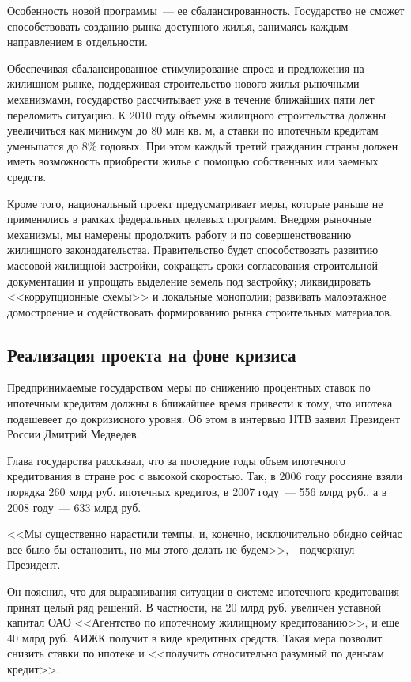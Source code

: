 \documentclass[article, 12pt, russian, oneside]{ncc}
\begin{document}
Особенность новой программы~--- ее сбалансированность. Государство не
сможет способствовать созданию рынка доступного жилья, занимаясь
каждым направлением в отдельности.

Обеспечивая сбалансированное стимулирование спроса и предложения на
жилищном рынке, поддерживая строительство нового жилья рыночными
механизмами, государство рассчитывает уже в течение ближайших пяти лет
переломить ситуацию. К 2010 году объемы жилищного строительства должны
увеличиться как минимум до 80 млн кв. м, а ставки по ипотечным
кредитам уменьшатся до 8\% годовых. При этом каждый третий гражданин
страны должен иметь возможность приобрести жилье с помощью собственных
или заемных средств.

Кроме того, национальный проект предусматривает меры, которые раньше
не применялись в рамках федеральных целевых программ. Внедряя рыночные
механизмы, мы намерены продолжить работу и по совершенствованию
жилищного законодательства. Правительство будет способствовать
развитию массовой жилищной застройки, сокращать сроки согласования
строительной документации и упрощать выделение земель под застройку;
ликвидировать <<коррупционные схемы>> и локальные монополии; развивать
малоэтажное домостроение и содействовать формированию рынка
строительных материалов.


\subsection{Реализация проекта на фоне кризиса}

Предпринимаемые государством меры по снижению процентных ставок по
ипотечным кредитам должны в ближайшее время привести к тому, что
ипотека подешевеет до докризисного уровня. Об этом в интервью НТВ
заявил Президент России Дмитрий Медведев.

Глава государства рассказал, что за последние годы объем ипотечного
кредитования в стране рос с высокой скоростью. Так, в 2006 году
россияне взяли порядка 260 млрд руб. ипотечных кредитов, в 2007 году~---
556 млрд руб., а в 2008 году~--- 633 млрд руб.

<<Мы существенно нарастили темпы, и, конечно, исключительно обидно
сейчас все было бы остановить, но мы этого делать не будем>>, -
подчеркнул Президент.

Он пояснил, что для выравнивания ситуации в системе ипотечного
кредитования принят целый ряд решений. В частности, на 20 млрд
руб. увеличен уставной капитал ОАО <<Агентство по ипотечному жилищному
кредитованию>>, и еще 40 млрд руб. АИЖК получит в виде кредитных
средств. Такая мера позволит снизить ставки по ипотеке и <<получить
относительно разумный по деньгам кредит>>.
\end{document}
